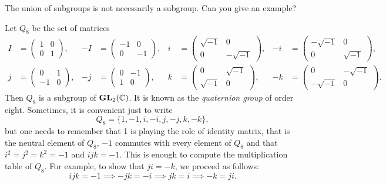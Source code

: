 \begin{exercise}
\label{xca:union}
        The union of subgroups is not necessarily 
        a subgroup. Can you give an example? 
\end{exercise}

\begin{example}
\label{exa:Q8}
    Let $Q_8$ be the set of matrices 
    \begin{align*}
        I&=\begin{pmatrix}
            1&0\\
            0&1
        \end{pmatrix},
        &
        -I&=\begin{pmatrix}
            -1&0\\
            0&-1
        \end{pmatrix},
        &
        i&=\begin{pmatrix}
            \sqrt{-1}&0\\
            0&-\sqrt{-1}
        \end{pmatrix},
        &
        -i&=\begin{pmatrix}
            -\sqrt{-1}&0\\
            0&\sqrt{-1}
        \end{pmatrix},\\
        j&=\begin{pmatrix}
            0&1\\
            -1&0
        \end{pmatrix},
        &
        -j&=\begin{pmatrix}
            0&-1\\
            1&0
        \end{pmatrix},
        &
        k&=\begin{pmatrix}
            0&\sqrt{-1}\\
            \sqrt{-1}&0
        \end{pmatrix},
        &
        -k &=\begin{pmatrix}
            0&-\sqrt{-1}\\
            -\sqrt{-1}&0
        \end{pmatrix}.
    \end{align*}
    Then $Q_8$ is a subgroup of $\mathbf{GL}_2(\mathbb{C})$. It is known as the \emph{quaternion group} of order eight. Sometimes, it is convenient just to write
    \[
    Q_8=\{1,-1,i,-i,j,-j,k,-k\}, 
    \]
    but one needs to remember 
    that 1 is playing the role of identity matrix, that is the neutral element of $Q_8$, 
    $-1$ commutes with every element of $Q_8$ 
    and that $i^2=j^2=k^2=-1$ and $ijk=-1$. This is enough to compute the multiplication table
    of $Q_8$. For example, to show that $ji=-k$, we proceed as follows: 
    \[
    ijk=-1\implies -jk=-i\implies jk=i\implies -k=ji.
    \]
\end{example}

